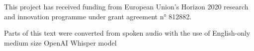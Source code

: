 \begin{comment}
\epigraph{\begin{otherlanguage}{russian}
Стёр строк больше, чем выдал Джон Гришам \\ Нос тёр жёстче разве что Жижек
\end{otherlanguage}}{Oxxxymiron}
\end{comment}



This project has received funding from European Union’s Horizon 2020 research and innovation programme under grant agreement n° 812882. 

Parts of this text were converted from spoken audio with the use of English-only medium size OpenAI Whisper model \cite{radfordRobustSpeechRecognition2022}